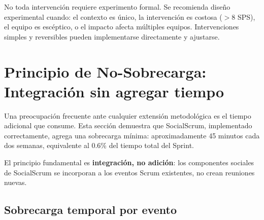 No toda intervención requiere experimento formal. Se recomienda diseño experimental cuando: el contexto es único, la intervención es costosa ($>$8 SPS), el equipo es escéptico, o el impacto afecta múltiples equipos. Intervenciones simples y reversibles pueden implementarse directamente y ajustarse.

\section{Principio de No-Sobrecarga: Integración sin agregar tiempo}

Una preocupación frecuente ante cualquier extensión metodológica es el tiempo adicional que consume. Esta sección demuestra que SocialScrum, implementado correctamente, agrega una sobrecarga mínima: aproximadamente 45 minutos cada dos semanas, equivalente al 0.6\% del tiempo total del Sprint.

El principio fundamental es \textbf{integración, no adición}: los componentes sociales de SocialScrum se incorporan a los eventos Scrum existentes, no crean reuniones nuevas.

\subsection{Sobrecarga temporal por evento}

